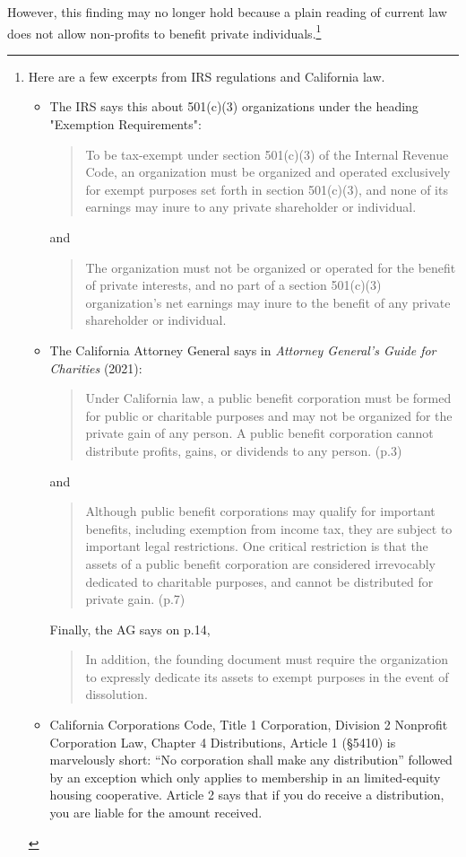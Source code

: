 However, this finding may no longer hold because a plain reading of current law does not allow non-profits to benefit private individuals.\footnote{Here are a few excerpts from IRS regulations and California law.
  
  \begin{itemize}
    \item The IRS says this about 501(c)(3) organizations under the heading "Exemption Requirements":
    \begin{quote}\noindent
      To be tax-exempt under section 501(c)(3) of the Internal Revenue Code, an organization must be organized and operated exclusively for exempt purposes set forth in section 501(c)(3), and none of its earnings may inure to any private shareholder or individual.
    \end{quote}
    and
    \begin{quote}
      The organization must not be organized or operated for the benefit of private interests, and no part of a section 501(c)(3) organization's net earnings may inure to the benefit of any private shareholder or individual.
    \end{quote}
    \item The California Attorney General says in \textit{Attorney General's Guide for Charities} (2021):
    \begin{quote}
      Under California law, a public beneﬁt corporation must be formed for public or charitable purposes and may not be organized for the private gain of any person. A public beneﬁt corporation cannot distribute proﬁts, gains, or dividends to any person. (p.3)
    \end{quote}
    and
    \begin{quote}
      Although public beneﬁt corporations may qualify for important beneﬁts, including exemption from income tax, they are subject to important legal restrictions. One critical restriction is that the assets of a public beneﬁt corporation are considered irrevocably dedicated to charitable purposes, and cannot be distributed for private gain. (p.7)
    \end{quote}
    Finally, the AG says on p.14,
    \begin{quote}
      In addition, the founding document must require the organization to expressly dedicate its assets to exempt purposes in the event of dissolution.
    \end{quote}
    \item California Corporations Code, Title 1 Corporation, Division 2 Nonprofit Corporation Law, Chapter 4 Distributions, Article 1 (§5410) is marvelously short: ``No corporation shall make any distribution'' followed by an exception which only applies to membership in an limited-equity housing cooperative. Article 2 says that if you do receive a distribution, you are liable for the amount received.
  \end{itemize}}
